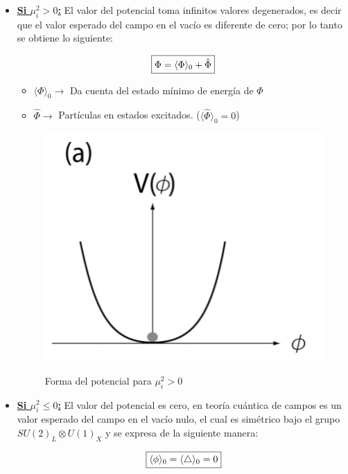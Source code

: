 \documentclass[12pt]{article}
\begin{document}
\begin{itemize}
    \item\underline{ \textbf{Si \( \mu_i^2>0 \):}} El valor del potencial toma infinitos valores degenerados, es decir que el valor esperado del campo en el vacío es diferente de cero; por lo tanto se obtiene lo siguiente: 
    
\[\fbox{$\Phi=\langle  \Phi \rangle_0 + \hat\Phi$}\]
\begin{itemize}
\item \(\langle  \Phi \rangle_0\rightarrow \)  Da cuenta del estado mínimo de energía de \(\Phi\)
\item \(\hat\Phi \rightarrow \) Partículas en estados excitados. (\(\langle \hat\Phi \rangle_0=0 \))
\end{itemize}

    \begin{figure}[h!]
    \begin{center}
        \includegraphics[scale=0.55]{Potencial Higgs.png}
        \caption\tiny{{Forma del potencial para $\mu_i^2>0$}}  
    \end{center}
\end{figure}


   \item\underline{ \textbf{Si \( \mu_i^2\leq 0 \):}} El valor del potencial es cero, en teoría cuántica de campos es un valor esperado del campo en el vacío nulo, el cual es simétrico bajo el grupo \(SU(2)_L \otimes U(1)_X\) y se expresa de la siguiente manera: 
    
\[\fbox{$\langle  \phi \rangle_0= \langle  \triangle \rangle_0= 0$}\] 


\end{itemize}
\end{document}
